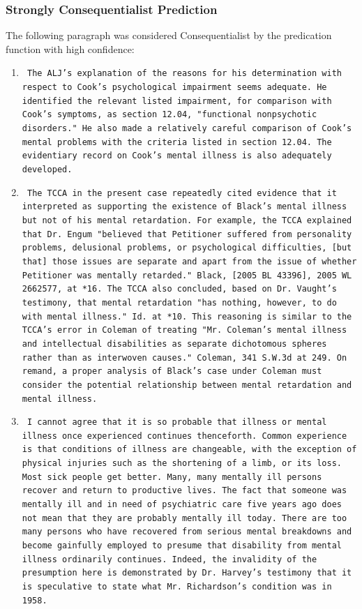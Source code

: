 \documentclass{article}
\begin{document}
\subsubsection{Strongly Consequentialist Prediction}
The following paragraph was considered Consequentialist by the predication function with high confidence: \newline
\begin{enumerate}
    \item 
\texttt{
The ALJ's explanation of the reasons for his determination with respect to Cook's psychological impairment seems adequate. He identified the relevant listed impairment, for comparison with Cook's symptoms, as section 12.04, "functional nonpsychotic disorders." He also made a relatively careful comparison of Cook's mental problems with the criteria listed in section 12.04. The evidentiary record on Cook's mental illness is also adequately developed.
}
    \item
\texttt{
The TCCA in the present case repeatedly cited evidence that it interpreted as supporting the existence of Black's mental illness but not of his mental retardation. For example, the TCCA explained that Dr. Engum "believed that Petitioner suffered from personality problems, delusional problems, or psychological difficulties, [but that] those issues are separate and apart from the issue of whether Petitioner was mentally retarded." Black, [2005 BL 43396], 2005 WL 2662577, at *16. The TCCA also concluded, based on Dr. Vaught's testimony, that mental retardation "has nothing, however, to do with mental illness." Id. at *10. This reasoning is similar to the TCCA's error in Coleman of treating "Mr. Coleman's mental illness and intellectual disabilities as separate dichotomous spheres rather than as interwoven causes." Coleman, 341 S.W.3d at 249. On remand, a proper analysis of Black's case under Coleman must consider the potential relationship between mental retardation and mental illness.
}
    \item
\texttt{
I cannot agree that it is so probable that illness or mental illness once experienced continues thenceforth. Common experience is that conditions of illness are changeable, with the exception of physical injuries such as the shortening of a limb, or its loss. Most sick people get better. Many, many mentally ill persons recover and return to productive lives. The fact that someone was mentally ill and in need of psychiatric care five years ago does not mean that they are probably mentally ill today. There are too many persons who have recovered from serious mental breakdowns and become gainfully employed to presume that disability from mental illness ordinarily continues. Indeed, the invalidity of the presumption here is demonstrated by Dr. Harvey's testimony that it is speculative to state what Mr. Richardson's condition was in 1958.
}
    
\end{enumerate}
\end{document}
